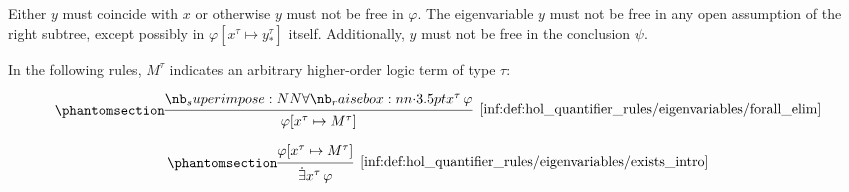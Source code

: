 \begin{definition}
\begin{thmenum}
\begin{paracol}{2}
      \begin{rightcolumn}
        \begin{thmenum}
           Either \( y \) must coincide with \( x \) or otherwise \( y \) must not be free in \( \varphi \).
           The eigenvariable \( y \) must not be free in any open assumption of the right subtree, except possibly in \( \varphi[x^\tau \mapsto y_*^\tau] \) itself.
           Additionally, \( y \) must not be free in the conclusion \( \psi \).
        \end{thmenum}
      \end{rightcolumn}
    \end{paracol}

     In the following rules, \( M^\tau \) indicates an arbitrary higher-order logic term of type \( \tau \):
    \begin{paracol}{2}
      \begin{leftcolumn}
        \ParacolAlignmentHack
        \begin{equation*}\taglabel[\ensuremath{ \forall_- }]{inf:def:hol_quantifier_rules/eigenvariables/forall_elim}
          \begin{prooftree}
            \hypo{ \qforall {x^\tau} \varphi }
            \infer1[\ref{inf:def:hol_quantifier_rules/eigenvariables/forall_elim}]{ \varphi[x^\tau \mapsto M^\tau] }
          \end{prooftree}
        \end{equation*}
      \end{leftcolumn}

      \begin{rightcolumn}
        \ParacolAlignmentHack
        \begin{equation*}\taglabel[\ensuremath{ \exists_+ }]{inf:def:hol_quantifier_rules/eigenvariables/exists_intro}
          \begin{prooftree}
            \hypo{ \varphi[x^\tau \mapsto M^\tau] }
            \infer1[\ref{inf:def:hol_quantifier_rules/eigenvariables/exists_intro}]{ \qexists {x^\tau} \varphi }
          \end{prooftree}
        \end{equation*}
      \end{rightcolumn}
    \end{paracol}
  \end{thmenum}
\end{definition}
